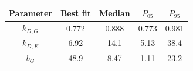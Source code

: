 \begin{tabular}{ccccc}
\toprule
Parameter & Best fit & Median & $P_{05}$ & $P_{95}$\\
\midrule
$k_{D,G}$ & 0.772 & 0.888 & 0.773 & 0.981\\
$k_{D,E}$ & 6.92 & 14.1 & 5.13 & 38.4\\
$b_G$ & 48.9 & 8.47 & 1.11 & 23.2\\
\bottomrule
\end{tabular}
